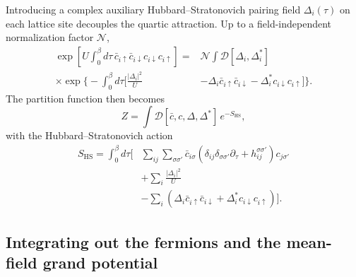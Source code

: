\documentclass[aps,prb,twocolumn,superscriptaddress,floatfix]{revtex4-2}
\begin{document}
Introducing a complex auxiliary Hubbard--Stratonovich pairing field $\Delta_i(\tau)$ on each lattice site decouples the quartic attraction. Up to a field-independent normalization factor $\mathcal{N}$,
\begin{equation}
\begin{aligned}
\exp\left[ U \int_0^\beta d\tau\, \bar{c}_{i\uparrow}\bar{c}_{i\downarrow}c_{i\downarrow}c_{i\uparrow} \right] ={}& \mathcal{N} \int \mathcal{D}[\Delta_i,\Delta_i^*] \\
\times \exp\Bigg\{ -\int_0^\beta d\tau \Bigg[ \frac{|\Delta_i|^2}{U} & - \Delta_i \bar{c}_{i\uparrow}\bar{c}_{i\downarrow} - \Delta_i^* c_{i\downarrow}c_{i\uparrow} \Bigg] \Bigg\}.
\end{aligned}
\label{eq:A4}
\end{equation}
The partition function then becomes
\begin{equation}
Z = \int \mathcal{D}[\bar{c},c,\Delta,\Delta^*]\, e^{-S_{\mathrm{HS}}},
\label{eq:A5}
\end{equation}
with the Hubbard--Stratonovich action
\begin{equation}
\begin{aligned}
S_{\mathrm{HS}} = \int_0^\beta d\tau \Bigg[ & \sum_{ij}\sum_{\sigma\sigma'} \bar{c}_{i\sigma}\left(\delta_{ij}\delta_{\sigma\sigma'}\partial_\tau + h_{ij}^{\sigma\sigma'}\right)c_{j\sigma'} \\
& + \sum_i \frac{|\Delta_i|^2}{U} \\
& - \sum_i \left(\Delta_i \bar{c}_{i\uparrow}\bar{c}_{i\downarrow} + \Delta_i^* c_{i\downarrow}c_{i\uparrow}\right) \Bigg].
\end{aligned}
\label{eq:A6}
\end{equation}

\subsection{Integrating out the fermions and the mean-field grand potential}
\end{document}

